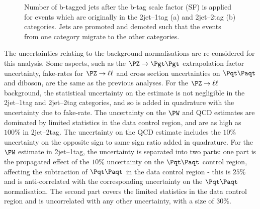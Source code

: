 \begin{figure}
\begin{center}

\end{center}
\caption[Number of b-tagged jets after the b-tag scale factor is applied for events which
are originally in the 2jet--1tag (a) and 2jet--2tag (b) categories.]{
Number of b-tagged jets after the b-tag scale factor (SF) is applied for events which
are originally in the 2jet--1tag (a) and 2jet--2tag (b) categories. Jets
are promoted and demoted such that the events from one category
migrate to the other categories.}
\label{fig:Hhhbtagsystematic}
\end{figure}

The uncertainties relating to the background normalisations are re-considered
for this analysis. Some aspects, such as the $\ZToTauTau$ extrapolation factor
uncertainty, fake-rates for $\PZ\to\ell\ell$ and cross section uncertainties on
$\ttbar$ and diboson, are the same as the previous analyses. For the
$\PZ\to\ell\ell$ background, the statistical uncertainty on the estimate is not
negligible in the 2jet--1tag and 2jet--2tag categories, and so is added in
quadrature with the uncertainty due to fake-rate. The uncertainty on the
$\PW$ and QCD estimates are dominated by limited statistics in the data control
region, and are as high as $100\%$ in 2jet--2tag. The uncertainty on the QCD
estimate includes the $10\%$ uncertainty on the opposite sign to same sign ratio
added in quadrature. For the $\PW$ estimate in 2jet--1tag, the uncertainty is
separated into two parts: one part is the propagated effect of the $10\%$
uncertainty on the $\ttbar$ control region, affecting the subtraction of
$\ttbar$ in the data control region - this is $25\%$ and is anti-correlated with
the corresponding uncertainty on the $\ttbar$ normalisation. The second part
covers the limited statistics in the data control region and is uncorrelated
with any other uncertainty, with a size of $30\%$.

